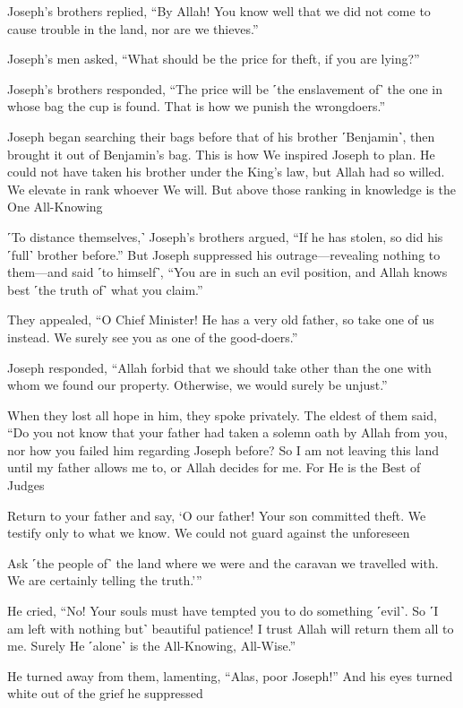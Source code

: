 Joseph’s brothers replied, “By Allah! You know well that we did not come to cause trouble in the land, nor are we thieves.”

Joseph’s men asked, “What should be the price for theft, if you are lying?”

Joseph’s brothers responded, “The price will be ˹the enslavement of˺ the one in whose bag the cup is found. That is how we punish the wrongdoers.”

Joseph began searching their bags before that of his brother ˹Benjamin˺, then brought it out of Benjamin’s bag. This is how We inspired Joseph to plan. He could not have taken his brother under the King’s law, but Allah had so willed. We elevate in rank whoever We will. But above those ranking in knowledge is the One All-Knowing

˹To distance themselves,˺ Joseph’s brothers argued, “If he has stolen, so did his ˹full˺ brother before.” But Joseph suppressed his outrage—revealing nothing to them—and said ˹to himself˺, “You are in such an evil position, and Allah knows best ˹the truth of˺ what you claim.”

They appealed, “O Chief Minister! He has a very old father, so take one of us instead. We surely see you as one of the good-doers.”

Joseph responded, “Allah forbid that we should take other than the one with whom we found our property. Otherwise, we would surely be unjust.”

When they lost all hope in him, they spoke privately. The eldest of them said, “Do you not know that your father had taken a solemn oath by Allah from you, nor how you failed him regarding Joseph before? So I am not leaving this land until my father allows me to, or Allah decides for me. For He is the Best of Judges

Return to your father and say, ‘O our father! Your son committed theft. We testify only to what we know. We could not guard against the unforeseen

Ask ˹the people of˺ the land where we were and the caravan we travelled with. We are certainly telling the truth.’”

He cried, “No! Your souls must have tempted you to do something ˹evil˺. So ˹I am left with nothing but˺ beautiful patience! I trust Allah will return them all to me. Surely He ˹alone˺ is the All-Knowing, All-Wise.”

He turned away from them, lamenting, “Alas, poor Joseph!” And his eyes turned white out of the grief he suppressed

